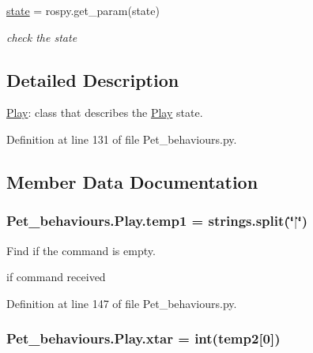\begin{DoxyCompactItemize}
\item 
\hyperlink{classPet__behaviours_1_1Play_ad1cd8e207b954e328020bc5026bff92e}{state} = rospy.\+get\+\_\+param(\textquotesingle{}state\textquotesingle{})\hypertarget{classPet__behaviours_1_1Play_ad1cd8e207b954e328020bc5026bff92e}{}\label{classPet__behaviours_1_1Play_ad1cd8e207b954e328020bc5026bff92e}

\begin{DoxyCompactList}\small\item\em check the state \end{DoxyCompactList}\end{DoxyCompactItemize}


\subsection{Detailed Description}
\hyperlink{classPet__behaviours_1_1Play}{Play}\+: class that describes the \hyperlink{classPet__behaviours_1_1Play}{Play} state. 

Definition at line 131 of file Pet\+\_\+behaviours.\+py.



\subsection{Member Data Documentation}
\subsubsection[{\texorpdfstring{temp1}{temp1}}]{\setlength{\rightskip}{0pt plus 5cm}Pet\+\_\+behaviours.\+Play.\+temp1 = strings.\+split(\char`\"{}$\vert$\char`\"{})\hspace{0.3cm}{\ttfamily [static]}}\hypertarget{classPet__behaviours_1_1Play_a0140f371bf2370c8f93925750383841f}{}\label{classPet__behaviours_1_1Play_a0140f371bf2370c8f93925750383841f}


Find if the command is empty. 

if command received 

Definition at line 147 of file Pet\+\_\+behaviours.\+py.

\subsubsection[{\texorpdfstring{xtar}{xtar}}]{\setlength{\rightskip}{0pt plus 5cm}Pet\+\_\+behaviours.\+Play.\+xtar = int({\bf temp2}\mbox{[}0\mbox{]})\hspace{0.3cm}{\ttfamily [static]}}\hypertarget{classPet__behaviours_1_1Play_aa7e0891e996e7d38e850cc388516b0c7}{}\label{classPet__behaviours_1_1Play_aa7e0891e996e7d38e850cc388516b0c7}


